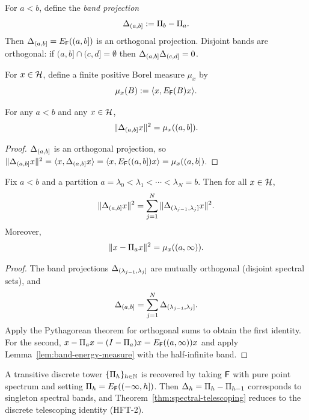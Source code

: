 \begin{definition}
\label{def:band-projection}
For $a<b$, define the \emph{band projection}
\[
\Delta_{(a,b]} := \Pi_{b} - \Pi_{a}.
\]
Then $\Delta_{(a,b]} = E_{\mathsf{F}}((a,b])$ is an orthogonal projection. Disjoint bands are orthogonal:
if $(a,b]\cap(c,d]=\emptyset$ then $\Delta_{(a,b]}\Delta_{(c,d]}=0$.
\end{definition}

\begin{definition}
\label{def:resolution-measure}
For $x\in \mathcal{H}$, define a finite positive Borel measure $\mu_x$ by
\[
\mu_x(B) := \langle x, E_{\mathsf{F}}(B)x\rangle.
\]
\end{definition}

\begin{lemma}
\label{lem:band-energy-measure}
For any $a<b$ and any $x\in \mathcal{H}$,
\[
\|\Delta_{(a,b]}x\|^2 = \mu_x((a,b]).
\]
\end{lemma}

\begin{proof}
$\Delta_{(a,b]}$ is an orthogonal projection, so
$\|\Delta_{(a,b]}x\|^2=\langle x,\Delta_{(a,b]}x\rangle
=\langle x,E_{\mathsf{F}}((a,b])x\rangle=\mu_x((a,b])$.
\end{proof}

\begin{theorem}
\label{thm:spectral-telescoping}
Fix $a<b$ and a partition $a=\lambda_0<\lambda_1<\cdots<\lambda_N=b$.
Then for all $x\in \mathcal{H}$,
\[
\|\Delta_{(a,b]}x\|^2 = \sum_{j=1}^{N}\|\Delta_{(\lambda_{j-1},\lambda_j]}x\|^2.
\]
Moreover,
\[
\|x-\Pi_{a} x\|^2 = \mu_x((a,\infty)).
\]
\end{theorem}

\begin{proof}
The band projections $\Delta_{(\lambda_{j-1},\lambda_j]}$ are mutually orthogonal (disjoint spectral sets), and
\[
\Delta_{(a,b]} = \sum_{j=1}^{N}\Delta_{(\lambda_{j-1},\lambda_j]}.
\]
Apply the Pythagorean theorem for orthogonal sums to obtain the first identity.
For the second, $x-\Pi_{a} x = (I-\Pi_{a})x = E_{\mathsf{F}}((a,\infty))x$ and apply Lemma~\ref{lem:band-energy-measure} with the half-infinite band.
\end{proof}

\begin{remark}
\label{rem:discrete-as-special-case}
A transitive discrete tower $\{\Pi_{h}\}_{h\in\mathbb{N}}$ is recovered by taking $\mathsf{F}$ with pure point spectrum and setting $\Pi_{h}=E_{\mathsf{F}}((-\infty,h])$.
Then $\Delta_{h}=\Pi_{h}-\Pi_{h-1}$ corresponds to singleton spectral bands, and Theorem~\ref{thm:spectral-telescoping} reduces to the discrete telescoping identity (HFT-2).
\end{remark}
